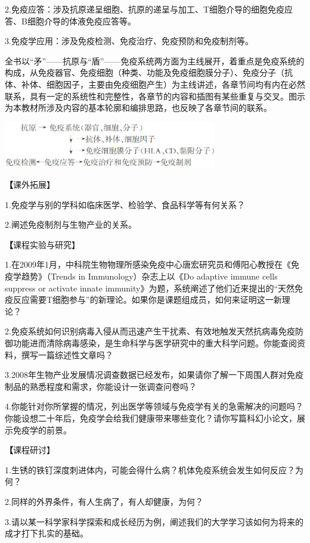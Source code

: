 2.免疫应答：涉及抗原递呈细胞、抗原的递呈与加工、T细胞介导的细胞免疫应答、B细胞介导的体液免疫应答等。

3.免疫学应用：涉及免疫检测、免疫治疗、免疫预防和免疫制剂等。

全书以“矛”------抗原与“盾”------免疫系统两方面为主线展开，着重点是免疫系统的构成，从免疫器官、免疫细胞（种类、功能及免疫细胞膜分子）、免疫分子（抗体、补体、细胞因子，主要由免疫细胞产生）为主线讲述，各章节间均有内在必然联系，具有一定的系统性和完整性，各章节的内容和插图有某些重复与交叉。图示为本教材所涉及内容的基本轮廓和编排思路，也反映了各章节间的联系。
\begin{center}
\includegraphics[width=0.7\textwidth]{./images/Image00024.jpg}
\end{center}
{\textbf 【课外拓展】}

1.免疫学与别的学科如临床医学、检验学、食品科学等有何关系？

2.阐述免疫制剂与生物产业的关系。

{\textbf 【课程实验与研究】}

1.在2009年1月，中科院生物物理所感染免疫中心唐宏研究员和傅阳心教授在《免疫学趋势》（Trends
in Immunology）杂志上以《Do adaptive immune cells suppress or activate
innate
immunity》为题，系统阐述了他们近来提出的“天然免疫反应需要T细胞参与”的新理论。如果你是课题组成员，如何来证明这一新理论？

2.免疫系统如何识别病毒入侵从而迅速产生干扰素、有效地触发天然抗病毒免疫防御功能进而清除病毒感染，是生命科学与医学研究中的重大科学问题。你能查阅资料，撰写一篇综述性文章吗？

3.2008年生物产业发展情况调查数据已经发布，如果请你了解一下周围人群对免疫制品的熟悉程度和需求，你能设计一张调查问卷吗？

4.你能针对你所掌握的情况，列出医学等领域与免疫学有关的急需解决的问题吗？你能设想二十年后，免疫学会给我们健康带来哪些变化？请你写篇科幻小论文，展示免疫学的前景。

{\textbf 【课程研讨】}

1.生锈的铁钉深度刺进体内，可能会得什么病？机体免疫系统会发生如何反应？为何？

2.同样的外界条件，有人生病了，有人却健康，为何？

3.请以某一科学家科学探索和成长经历为例，阐述我们的大学学习该如何为将来的成才打下扎实的基础。

